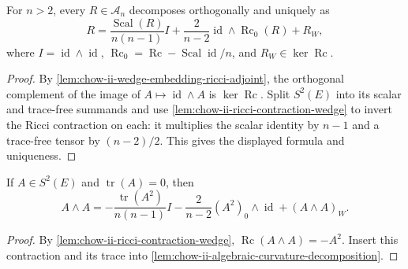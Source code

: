 \begin{lemma}
  \label{lem:chow-ii-algebraic-curvature-decomposition}
  For \(n>2\), every \(R\in\mathcal A_n\) decomposes orthogonally and uniquely as
  \[
  R=\frac{\operatorname{Scal}(R)}{n(n-1)}I
    +\frac2{n-2}\operatorname{id}\wedge\operatorname{Rc}_0(R)+R_W,
  \]
  where \(I=\operatorname{id}\wedge\operatorname{id}\),
  \(\operatorname{Rc}_0=\operatorname{Rc}-\operatorname{Scal}\operatorname{id}/n\),
  and \(R_W\in\ker\operatorname{Rc}\).
\end{lemma}
\begin{proof}
\sketch
  By \ref{lem:chow-ii-wedge-embedding-ricci-adjoint}, the orthogonal
  complement of the image of \(A\mapsto\operatorname{id}\wedge A\) is
  \(\ker\operatorname{Rc}\).  Split \(S^2(E)\) into its scalar and trace-free
  summands and use \ref{lem:chow-ii-ricci-contraction-wedge} to invert the
  Ricci contraction on each: it multiplies the scalar identity by \(n-1\)
  and a trace-free tensor by \((n-2)/2\).  This gives the displayed formula
  and uniqueness.
\end{proof}

\begin{corollary}
  \label{cor:chow-ii-trace-free-square-wedge-decomposition}
  If \(A\in S^2(E)\) and \(\operatorname{tr}(A)=0\), then
  \[
  A\wedge A=-\frac{\operatorname{tr}(A^2)}{n(n-1)}I
    -\frac2{n-2}(A^2)_0\wedge\operatorname{id}+(A\wedge A)_W.
  \]
\end{corollary}
\begin{proof}
\sketch
  By \ref{lem:chow-ii-ricci-contraction-wedge},
  \(\operatorname{Rc}(A\wedge A)=-A^2\).  Insert this contraction and its
  trace into \ref{lem:chow-ii-algebraic-curvature-decomposition}.
\end{proof}

